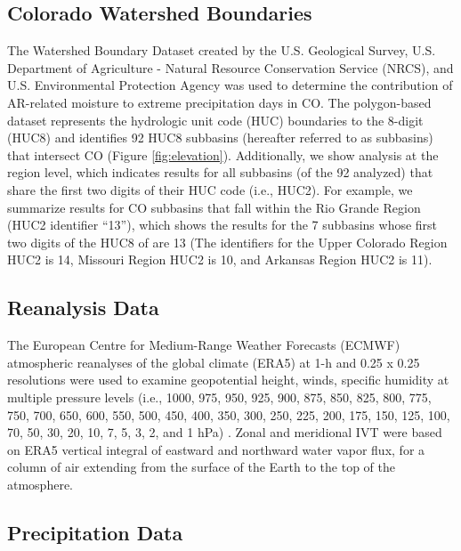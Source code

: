 \documentclass[draft]{agujournal2019}
\begin{document}
\subsection{Colorado Watershed Boundaries}
The Watershed Boundary Dataset created by the U.S. Geological Survey, U.S. Department of Agriculture - Natural Resource Conservation Service (NRCS), and U.S. Environmental Protection Agency was used to determine the contribution of AR-related moisture to extreme precipitation days in CO. The polygon-based dataset represents the hydrologic unit code (HUC) boundaries to the 8-digit (HUC8) and identifies 92 HUC8 subbasins (hereafter referred to as subbasins) that intersect CO (Figure \ref{fig:elevation}). Additionally, we show analysis at the region level, which indicates results for all subbasins (of the 92 analyzed) that share the first two digits of their HUC code (i.e., HUC2). For example, we summarize results for CO subbasins that fall within the Rio Grande Region (HUC2 identifier “13”), which shows the results for the 7 subbasins whose first two digits of the HUC8 of are 13 (The identifiers for the Upper Colorado Region HUC2 is 14, Missouri Region HUC2 is 10, and Arkansas Region HUC2 is 11).

\subsection{Reanalysis Data}
\label{sec:data:reanalysis}
The European Centre for Medium-Range Weather Forecasts (ECMWF) atmospheric reanalyses of the global climate (ERA5) at 1-h and 0.25\textdegree{} x 0.25\textdegree{} resolutions were used to examine geopotential height, winds, specific humidity at multiple pressure levels (i.e., 1000, 975, 950, 925, 900, 875, 850, 825, 800, 775, 750, 700, 650, 600, 550, 500, 450, 400, 350, 300, 250, 225, 200, 175, 150, 125, 100, 70, 50, 30, 20, 10, 7, 5, 3, 2, and 1 hPa) \cite{Hersbach2020}. Zonal and meridional IVT were based on ERA5 vertical integral of eastward and northward water vapor flux, for a column of air extending from the surface of the Earth to the top of the atmosphere.


\subsection{Precipitation Data}
\end{document}
